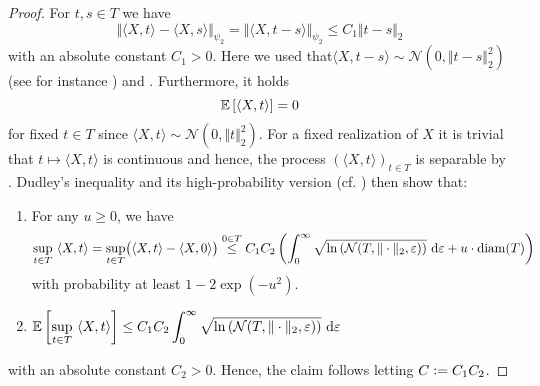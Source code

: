 \begin{proof}
For $t,s \in T$ we have
\begin{equation*}
\Vert \langle X,t \rangle - \langle X,s \rangle \Vert_{\psi_2} = \Vert \langle X, t-s \rangle \Vert_{\psi_2} \leq C_1 \Vert t -s \Vert_2
\end{equation*}
with an absolute constant $C_1>0$. Here we used that$\langle X, t-s \rangle \sim \mathcal{N}(0, \Vert t -s \Vert_2^2)$ (see for instance \cite[Exercise 3.3.3]{vershynin_high-dimensional_2018}) and \cite[Example 2.5.8 (i)]{vershynin_high-dimensional_2018}. Furthermore, it holds
\begin{equation*}
\mathbb{E} \left[ \langle X,t \rangle\right] = 0
\end{equation*}
for fixed $t \in T$ since $\langle X,t \rangle \sim \mathcal{N}(0, \Vert  t \Vert_2^2)$. For a fixed realization of $X$ it is trivial that $t \mapsto \langle X,t \rangle$ is continuous and hence, the process $(\langle X,t \rangle)_{t \in T}$ is separable by . Dudley's inequality and its high-probability version (cf. ) then show that:
\begin{enumerate}
\item{ For any $u \geq 0$, we have
\begin{equation*}
\underset{t \in T}{\sup} \ \langle X, t \rangle = \underset{t \in T}{\sup}  \big(\langle X,t \rangle - \langle X, 0 \rangle \big)\overset{0 \in T}{\leq}  C_1C_2 \left(\int_0^\infty \sqrt{\ln \left(\mathcal{N}(T, \Vert \cdot \Vert_2, \varepsilon)\right)} \ \mathrm{d} \varepsilon + u \cdot \operatorname{diam}(T)\right)
\end{equation*}
with probability at least $1 - 2\exp(-u^2)$. 
}
\item{
$ \displaystyle
\mathbb{E} \left[ \underset{t \in T}{\sup} \ \langle X, t \rangle\right] \leq C_1C_2\int_0^\infty \sqrt{\ln \left(\mathcal{N}(T, \Vert \cdot \Vert_2, \varepsilon)\right)} \ \mathrm{d} \varepsilon
$}
\end{enumerate}
with an absolute constant $C_2 > 0$. Hence, the claim follows letting $C \mathrel{\mathop:}= C_1C_2$. 
\end{proof}


